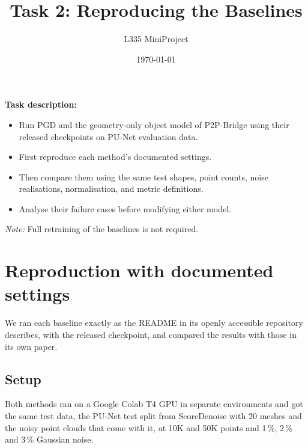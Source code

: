 \documentclass[11pt,a4paper]{article}
\title{Task 2: Reproducing the Baselines}
\author{L335 MiniProject}
\date{\today}
\makeatletter
\renewcommand{\maketitle}{%
  \noindent{\LARGE \@title\par}\vspace{0.6em}
  \noindent{\large \@author\hfill\@date\par}\vspace{3em}}
\makeatother
\begin{document}
\maketitle

\noindent\textbf{Task description:} 
\begin{itemize}[label=--, leftmargin=2.5em, rightmargin=2.5em, labelindent=1em, labelwidth=1em, labelsep=0.5em, align=left, topsep=0pt, partopsep=0pt, itemsep=0pt, parsep=0pt]
\item Run PGD and the geometry-only object model of P2P-Bridge using their released checkpoints on PU-Net evaluation data.
\item First reproduce each method's documented settings.
\item Then compare them using the same test shapes, point counts, noise realisations, normalisation, and metric definitions.
\item Analyse their failure cases before modifying either model.
\end{itemize}
\noindent\hspace*{1em}\textit{Note:} Full retraining of the baselines is not required.
\vspace{1.3em}%

\section{Reproduction with documented settings}

We ran each baseline exactly as the README in its openly accessible repository describes, with the released checkpoint, and compared the results with those in its own paper.

\subsection{Setup}\label{sec:setup}

Both methods ran on a Google Colab T4 GPU in separate environments and got the same test data, the PU-Net test split from ScoreDenoise with 20 meshes and the noisy point clouds that come with it, at 10K and 50K points and 1\,\%, 2\,\% and 3\,\% Gaussian noise.
\end{document}
